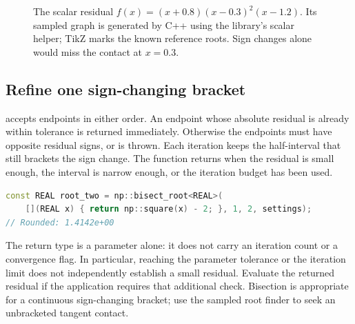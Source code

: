 \begin{figure}[htbp]
\centering
{}
\caption{The scalar residual
$f(x)=(x+0.8)(x-0.3)^2(x-1.2)$. Its sampled graph is generated by C++ using
the library's scalar helper; TikZ marks the known reference roots. Sign changes
alone would miss the contact at $x=0.3$.}
\label{fig:scalar-roots}
\end{figure}

\subsection{Refine one sign-changing bracket}

 accepts endpoints in
either order. An endpoint whose absolute residual is already within tolerance
is returned immediately. Otherwise the endpoints must have opposite residual
signs, or  is thrown. Each iteration keeps the
half-interval that still brackets the sign change. The function returns when
the residual is small enough, the interval is narrow enough, or the iteration
budget has been used.
\par\noindent\begin{minipage}{\linewidth}
\begin{lstlisting}[language=C++]
const REAL root_two = np::bisect_root<REAL>(
    [](REAL x) { return np::square(x) - 2; }, 1, 2, settings);
// Rounded: 1.4142e+00
\end{lstlisting}
\end{minipage}\par
The return type is a parameter alone: it does not carry an iteration count or
a convergence flag. In particular, reaching the parameter tolerance or the
iteration limit does not independently establish a small residual. Evaluate
the returned residual if the application requires that additional check.
Bisection is appropriate for a continuous sign-changing bracket; use the
sampled root finder to seek an unbracketed tangent contact.

